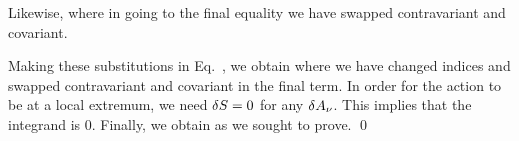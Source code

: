{	Likewise,
	\al{
		\int \Fsmn \,\delFmn \dqx &= -\int ( \delAn \,\partm \partsm \Asn - \delAm \,\partn \partsm\Asn - \delAn \,\partm \partsn \Asm + \delAm \,\partn \partsn \Asm ) \dqx \\
		&= -\int ( \delAn \,\partm \Fsmn + \delAm \,\partn \Fsnm ) \dqx
		= -\int ( \delAn \,\partm \Fsmn + \delAn \,\partm \Fsmn ) \dqx \\
		&= -\int ( \delAsn \,\partsm \Fmn + \delAsn \,\partsm \Fmn ) \dqx,
	}
	where in going to the final equality we have swapped contravariant and covariant.
	
	Making these substitutions in Eq.~, we obtain
	where we have changed indices and swapped contravariant and covariant in the final term.  In order for the action to be at a local extremum, we need $\delta S = 0$ for any $\delta A_\nu$.  This implies that the integrand is 0.  Finally, we obtain
	as we sought to prove. \qed
}

%
%


